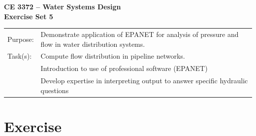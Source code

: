 \documentclass[12pt]{article}
\begin{document}
\begin{center}
{\textbf{{ CE 3372 -- Water Systems Design} \\ {Exercise Set 5}}}
\end{center}
\begingroup
\begin{tabular}{p{1in} p{5in}}
Purpose: & Demonstrate application of EPANET for analysis of pressure and flow in water distribution systems.\\
Task(s): & Compute flow distribution in pipeline networks.  \\
~ & Introduction to use of professional software (EPANET) \\
~ & Develop expertise in interpreting output to answer specific hydraulic questions\\
\end{tabular}
\endgroup
\section*{\small{Exercise}}
\end{document}
